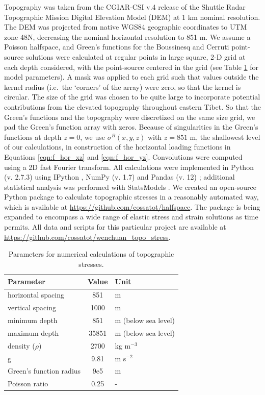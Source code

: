 \documentclass[twocolumn,jgrga]{AGUTeX}
\begin{document}
\begin{article}
Topography was taken from the CGIAR-CSI v.4 release
\citep{jarvis2008srtm} of the Shuttle Radar Topographic Mission
\citep{farr2007srtm} Digital Elevation Model (DEM) at 1 km nominal
resolution. The DEM was projected from native WGS84 geographic
coordinates to UTM zone 48N, decreasing the nominal horizontal
resolution to 851 m. We assume a Poisson halfspace, and Green's
functions for the Boussinesq and Cerruti point-source solutions were
calculated at regular points in large square, 2-D grid at each depth
considered, with the point-source centered in the grid (see Table
\ref{table:convo_params} for model parameters). A mask was applied to
each grid such that values outside the kernel radius (i.e.~the `corners'
of the array) were zero, so that the kernel is circular. The size of the
grid was chosen to be quite large to incorporate potential contributions
from the elevated topography throughout eastern Tibet. So that the
Green's functions and the topography were discretized on the same size
grid, we pad the Green's function array with zeros. Because of
singularities in the Green's functions at depth $z=0$, we use
$\sigma^B(x,y,z)$ with $z=851$ m, the shallowest level of our
calculations, in construction of the horizontal loading functions in
Equations \ref{eqn:f_hor_xz} and \ref{eqn:f_hor_yz}. Convolutions were
computed using a 2D fast Fourier transform. All calculations were
implemented in Python (v. 2.7.3) using IPython \citep{perez2007ipython},
NumPy (v. 1.7) \citep{oliphant2007numpy} and Pandas (v. 12)
\citep{mckinney2010}; additional statistical analysis was performed with
StatsModels \citep{seabold2010}. We created an open-source Python package
to calculate topographic stresses in a reasonably automated way, which
is available at \url{https://github.com/cossatot/halfspace}. The package
is being expanded to encompass a wide range of elastic stress and strain
solutions as time permits. All data and scripts for this particular
project are available at
\url{https://github.com/cossatot/wenchuan_topo_stress}.

\begin{table}
\centering
\begin{tabular}{l c l}
\hline
Parameter & Value & Unit \\
\hline
horizontal spacing & 851 & m \\ 
vertical spacing & 1000 & m \\ 
minimum depth & 851 & m (below sea level) \\ 
maximum depth & 35851 & m (below sea level) \\ 
density ($\rho$) & 2700 & kg m$^{-3}$ \\ 
g & 9.81 & m s$^{-2}$ \\ 
Green's function radius & 9e5 & m \\ 
Poisson ratio & 0.25 & - \\ 
\hline
\end{tabular}
\caption{Parameters for numerical calculations of topographic stresses.}
\label{table:convo_params}
\end{table}


\end{article}
\end{document}
